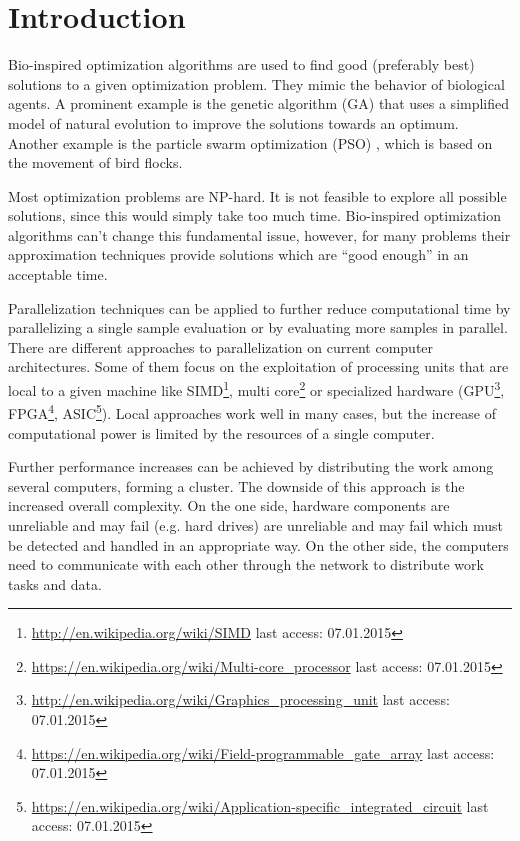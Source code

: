 \chapter{Introduction}
Bio-inspired optimization algorithms are used to find good (preferably best) solutions to a given optimization problem. They mimic the behavior of biological agents. A prominent example is the genetic algorithm (GA) \cite{sivanandam2008genetic} that uses a simplified model of natural evolution to improve the solutions towards an optimum. Another example is the particle swarm optimization (PSO) \cite{kennedy2010particle}, which is based on the movement of bird flocks.

Most optimization problems are NP-hard. It is not feasible to explore all possible solutions, since this would simply take too much time. Bio-inspired optimization algorithms can't change this fundamental issue, however, for many problems their approximation techniques provide solutions which are ``good enough'' in an acceptable time.

Parallelization techniques can be applied to further reduce computational time by parallelizing a single sample evaluation or by evaluating more samples in parallel. There are different approaches to parallelization on current computer architectures. Some of them focus on the exploitation of processing units that are local to a given machine like SIMD\footnote{\url{http://en.wikipedia.org/wiki/SIMD} last access: 07.01.2015}, multi core\footnote{\url{https://en.wikipedia.org/wiki/Multi-core_processor} last access: 07.01.2015} or specialized hardware (GPU\footnote{\url{http://en.wikipedia.org/wiki/Graphics_processing_unit} last access: 07.01.2015}, FPGA\footnote{\url{https://en.wikipedia.org/wiki/Field-programmable_gate_array} last access: 07.01.2015}, ASIC\footnote{\url{https://en.wikipedia.org/wiki/Application-specific_integrated_circuit} last access: 07.01.2015}). Local approaches work well in many cases, but the increase of computational power is limited by the resources of a single computer.

Further performance increases can be achieved by distributing the work among several computers, forming a cluster. The downside of this approach is the increased overall complexity. On the one side, hardware components are unreliable and may fail (e.g. hard drives) are unreliable and may fail which must be detected and handled in an appropriate way. On the other side, the computers need to communicate with each other through the network to distribute work tasks and data.

